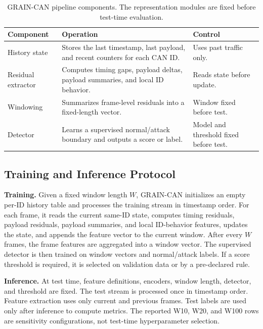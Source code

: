 \documentclass[runningheads]{llncs}
\newcommand{\method}{GRAIN-CAN}
\begin{document}
\begin{table}[t]
\centering
\caption{GRAIN-CAN pipeline components. The representation modules are fixed before test-time evaluation.}
\label{tab:components}
\small
\setlength{\tabcolsep}{5pt}
\renewcommand{\arraystretch}{1.08}
\begin{tabularx}{\textwidth}{p{} X p{}}
\toprule
Component & Operation & Control \\
\midrule
History state & Stores the last timestamp, last payload, and recent counters for each CAN ID. & Uses past traffic only. \\
Residual extractor & Computes timing gaps, payload deltas, payload summaries, and local ID behavior. & Reads state before update. \\
Windowing & Summarizes frame-level residuals into a fixed-length vector. & Window fixed before test. \\
Detector & Learns a supervised normal/attack boundary and outputs a score or label. & Model and threshold fixed before test. \\
\bottomrule
\end{tabularx}
\end{table}

\subsection{Training and Inference Protocol}
\textbf{Training.} Given a fixed window length \(W\), \method{} initializes an empty per-ID history table and processes the training stream in timestamp order. For each frame, it reads the current same-ID state, computes timing residuals, payload residuals, payload summaries, and local ID-behavior features, updates the state, and appends the feature vector to the current window. After every \(W\) frames, the frame features are aggregated into a window vector. The supervised detector is then trained on window vectors and normal/attack labels. If a score threshold is required, it is selected on validation data or by a pre-declared rule.

\textbf{Inference.} At test time, feature definitions, encoders, window length, detector, and threshold are fixed. The test stream is processed once in timestamp order. Feature extraction uses only current and previous frames. Test labels are used only after inference to compute metrics. The reported W10, W20, and W100 rows are sensitivity configurations, not test-time hyperparameter selection.
\end{document}
